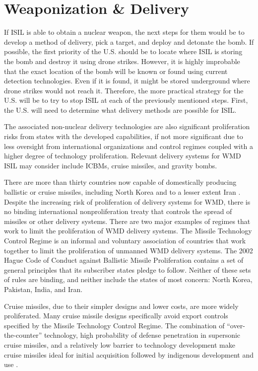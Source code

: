 \documentclass{report}
\begin{document}
\section{Weaponization \& Delivery}

If ISIL is able to obtain a nuclear weapon, the next steps for them would be to develop a method of delivery, pick a target, and deploy and detonate the bomb.  If possible, the first priority of the U.S. should be to locate where ISIL is storing the bomb and destroy it using drone strikes.  However, it is highly improbable that the exact location of the bomb will be known or found using current detection technologies.  Even if it is found, it might be stored underground where drone strikes would not reach it.  Therefore, the more practical strategy for the U.S. will be to try to stop ISIL at each of the previously mentioned steps.   First, the U.S. will need to determine what delivery methods are possible for ISIL.  


The associated non-nuclear delivery technologies are also significant proliferation risks from states with the developed capabilities, if not more significant due to less oversight from international organizations and control regimes coupled with a higher degree of technology proliferation. Relevant delivery systems for WMD ISIL may consider include ICBMs, cruise missiles, and gravity bombs. 

There are more than thirty countries now capable of domestically producing ballistic or cruise missiles, including North Korea and to a lesser extent Iran \cite{U.S.CongressOfficeofTechnology1993}. Despite the increasing risk of proliferation of delivery systems for WMD, there is no binding international nonproliferation treaty that controls the spread of missiles or other delivery systems. There are two major examples of regimes that work to limit the proliferation of WMD delivery systems. The Missile Technology Control Regime is an informal and voluntary association of countries that work together to limit the proliferation of unmanned WMD delivery systems. The 2002 Hague Code of Conduct against Ballistic Missile Proliferation contains a set of general principles that its subscriber states pledge to follow. Neither of these sets of rules are binding, and neither include the states of most concern: North Korea, Pakistan, India, and Iran.

Cruise missiles, due to their simpler designs and lower costs, are more widely proliferated. Many cruise missile designs specifically avoid export controls specified by the Missile Technology Control Regime. The combination of \enquote{over-the-counter} technology, high probability of defense penetration in supersonic cruise missiles, and a relatively low barrier to technology development make cruise missiles ideal for initial acquisition followed by indigenous development and use \cite{OfficeoftheUnderSecretaryofDefenseforAcquisitionandTechnology1998}. 
\end{document}
